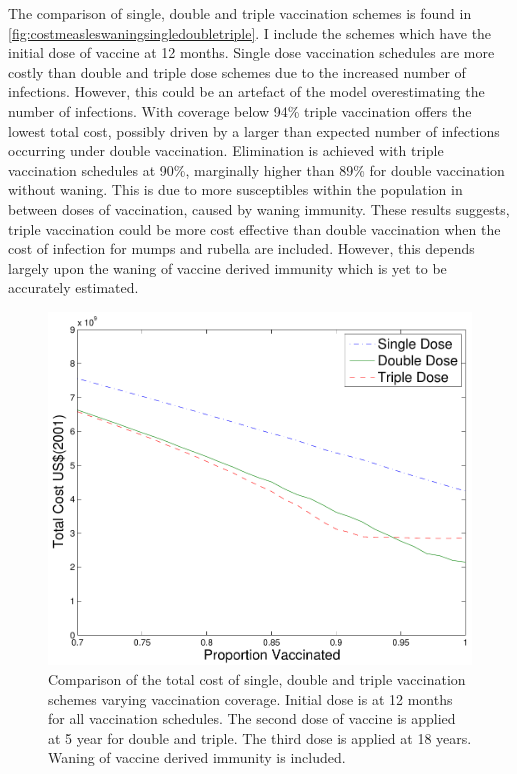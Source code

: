 \documentclass[a4paper,11pt] {scrartcl}
\begin{document}
The comparison of single, double and triple vaccination schemes is found in \autoref{fig:costmeasleswaningsingledoubletriple}. I include the schemes which have the initial dose of vaccine at 12 months. Single dose vaccination schedules are more costly than double and triple dose schemes due to the increased number of infections. However, this could be an artefact of the model overestimating the number of infections. With coverage below 94\% triple vaccination offers the lowest total cost, possibly driven by a larger than expected number of infections occurring under double vaccination. Elimination is achieved with triple vaccination schedules at 90\%, marginally higher than 89\% for double vaccination without waning. This is due to more susceptibles within the population in between doses of vaccination, caused by waning immunity. These results suggests, triple vaccination could be more cost effective than double vaccination when the cost of infection for mumps and rubella are included. However, this depends largely upon the waning of vaccine derived immunity which is yet to be accurately estimated.
\begin{figure}[h]
	\centering
	\includegraphics[width=120mm]{costmeasleswaningsingledoubletriple}
	\caption{Comparison of the total cost of single, double and triple vaccination schemes varying vaccination coverage. Initial dose is at 12 months for all vaccination schedules. The second dose of vaccine is applied at 5 year for double and triple. The third dose is applied at 18 years. Waning of vaccine derived immunity is included.}
	\label{fig:costmeasleswaningsingledoubletriple}
\end{figure}
\end{document}
